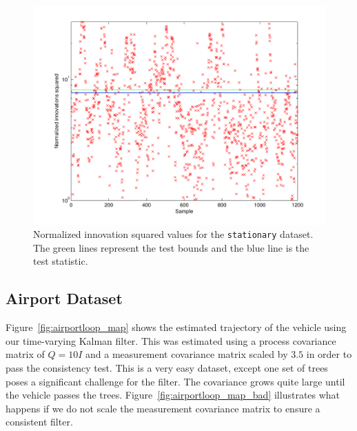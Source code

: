 \begin{figure}
\includegraphics[width=\columnwidth]{nis_stationary}
\caption{Normalized innovation squared values for the \texttt{stationary} dataset.  The green lines represent the test bounds and the blue line is the test statistic.}
\label{fig:nis_stationary}
\end{figure}



\subsection{Airport Dataset}
Figure~\ref{fig:airportloop_map} shows the estimated trajectory of the vehicle using our time-varying Kalman filter.  This was estimated using a process covariance matrix of $Q = 10I$ and a measurement covariance matrix scaled by $3.5$ in order to pass the consistency test.  This is a very easy dataset, except one set of trees poses a significant challenge for the filter.  The covariance grows quite large until the vehicle passes the trees.  Figure~\ref{fig:airportloop_map_bad} illustrates what happens if we do not scale the measurement covariance matrix to ensure a consistent filter.

